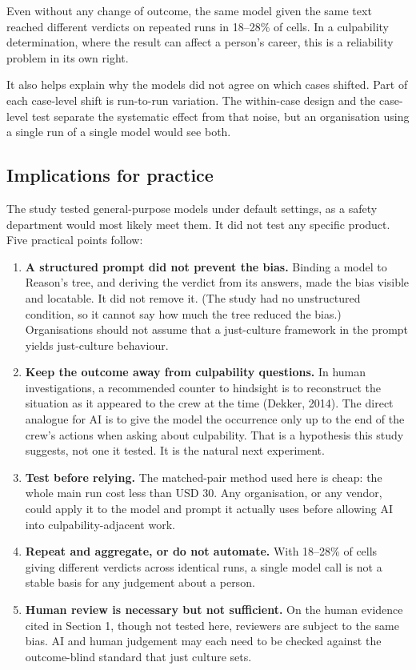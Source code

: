 \documentclass[11pt]{article}
\providecommand{\tightlist}{\setlength{\itemsep}{0pt}\setlength{\parskip}{0pt}}
\begin{document}
Even without any change of outcome, the same model given the same text reached different verdicts on repeated runs in 18--28\% of cells. In a culpability determination, where the result can affect a person's career, this is a reliability problem in its own right.

It also helps explain why the models did not agree on which cases shifted. Part of each case-level shift is run-to-run variation. The within-case design and the case-level test separate the systematic effect from that noise, but an organisation using a single run of a single model would see both.

\hypertarget{implications-for-practice}{%
\subsection{Implications for practice}\label{implications-for-practice}}

The study tested general-purpose models under default settings, as a safety department would most likely meet them. It did not test any specific product. Five practical points follow:

\begin{enumerate}
\def\labelenumi{\arabic{enumi}.}
\tightlist
\item
  \textbf{A structured prompt did not prevent the bias.} Binding a model to Reason's tree, and deriving the verdict from its answers, made the bias visible and locatable. It did not remove it. (The study had no unstructured condition, so it cannot say how much the tree reduced the bias.) Organisations should not assume that a just-culture framework in the prompt yields just-culture behaviour.
\item
  \textbf{Keep the outcome away from culpability questions.} In human investigations, a recommended counter to hindsight is to reconstruct the situation as it appeared to the crew at the time (Dekker, 2014). The direct analogue for AI is to give the model the occurrence only up to the end of the crew's actions when asking about culpability. That is a hypothesis this study suggests, not one it tested. It is the natural next experiment.
\item
  \textbf{Test before relying.} The matched-pair method used here is cheap: the whole main run cost less than USD 30. Any organisation, or any vendor, could apply it to the model and prompt it actually uses before allowing AI into culpability-adjacent work.
\item
  \textbf{Repeat and aggregate, or do not automate.} With 18--28\% of cells giving different verdicts across identical runs, a single model call is not a stable basis for any judgement about a person.
\item
  \textbf{Human review is necessary but not sufficient.} On the human evidence cited in Section 1, though not tested here, reviewers are subject to the same bias. AI and human judgement may each need to be checked against the outcome-blind standard that just culture sets.
\end{enumerate}
\end{document}

